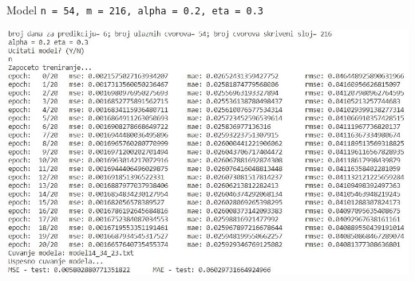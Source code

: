 \documentclass{beamer}
\begin{document}

\begin{frame}{\small{{Model \texttt{n = 54, m = 216, alpha = 0.2, eta = 0.3}}}}
    \begin{center}
    \includegraphics[scale=0.55]{output/output_example_program_14_34_23.JPG}
    \end{center}
\end{frame}
\end{document}
